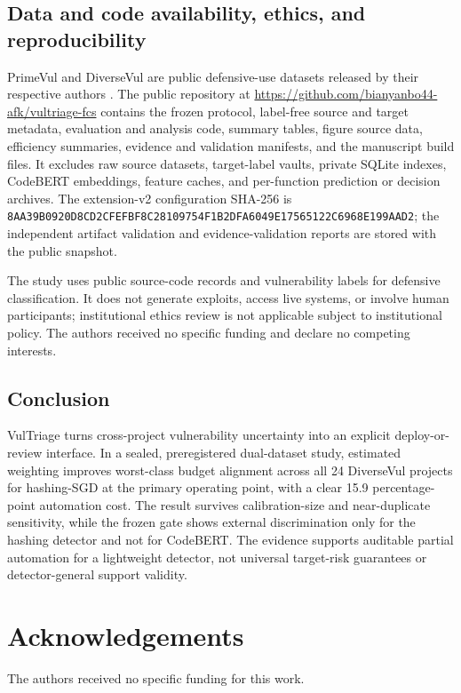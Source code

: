 \documentclass[research]{fcs}
\newcommand{\method}{VulTriage\xspace}
\begin{document}
\subsection{Data and code availability, ethics, and reproducibility}

PrimeVul and DiverseVul are public defensive-use datasets released by their respective authors \cite{ding2025primevul,chen2023diversevul}. The public repository at \url{https://github.com/bianyanbo44-afk/vultriage-fcs} contains the frozen protocol, label-free source and target metadata, evaluation and analysis code, summary tables, figure source data, efficiency summaries, evidence and validation manifests, and the manuscript build files. It excludes raw source datasets, target-label vaults, private SQLite indexes, CodeBERT embeddings, feature caches, and per-function prediction or decision archives. The extension-v2 configuration SHA-256 is \texttt{8AA39B09\allowbreak{}20D8CD2C\allowbreak{}FEFBF8C2\allowbreak{}8109754F\allowbreak{}1B2DFA60\allowbreak{}49E17565\allowbreak{}122C6968\allowbreak{}E199AAD2}; the independent artifact validation and evidence-validation reports are stored with the public snapshot.

The study uses public source-code records and vulnerability labels for defensive classification. It does not generate exploits, access live systems, or involve human participants; institutional ethics review is not applicable subject to institutional policy. The authors received no specific funding and declare no competing interests.

\subsection{Conclusion}

\method turns cross-project vulnerability uncertainty into an explicit deploy-or-review interface. In a sealed, preregistered dual-dataset study, estimated weighting improves worst-class budget alignment across all 24 DiverseVul projects for hashing-SGD at the primary operating point, with a clear 15.9 percentage-point automation cost. The result survives calibration-size and near-duplicate sensitivity, while the frozen gate shows external discrimination only for the hashing detector and not for CodeBERT. The evidence supports auditable partial automation for a lightweight detector, not universal target-risk guarantees or detector-general support validity.

\section*{Acknowledgements}
The authors received no specific funding for this work.
\end{document}
